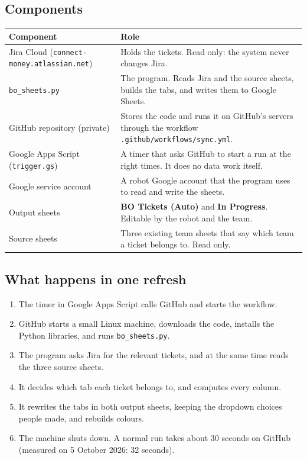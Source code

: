 \documentclass[11pt,a4paper]{article}
\newcommand{\code}[1]{\texttt{#1}}
\newcommand{\tab}[1]{\textbf{#1}}
\let\oldsubsection\subsection
\renewcommand{\subsection}{\needspace{7\baselineskip}\oldsubsection}
\begin{document}
\subsection{Components}
\begin{tabularx}{\linewidth}{@{}l L@{}}
\toprule
\textbf{Component} & \textbf{Role} \\
\midrule
Jira Cloud (\code{connect-money.atlassian.net}) & Holds the tickets. Read only: the system never changes Jira. \\
\code{bo\_sheets.py} & The program. Reads Jira and the source sheets, builds the tabs, and writes them to Google
Sheets. \\
GitHub repository (private) & Stores the code and runs it on GitHub's servers through the workflow
\code{.github/workflows/sync.yml}. \\
Google Apps Script (\code{trigger.gs}) & A timer that asks GitHub to start a run at the right times. It does no data
work itself. \\
Google service account & A robot Google account that the program uses to read and write the sheets. \\
Output sheets & \tab{BO Tickets (Auto)} and \tab{In Progress}. Editable by the robot and the team. \\
Source sheets & Three existing team sheets that say which team a ticket belongs to. Read only. \\
\bottomrule
\end{tabularx}

\subsection{What happens in one refresh}
\begin{enumerate}
  \item The timer in Google Apps Script calls GitHub and starts the workflow.
  \item GitHub starts a small Linux machine, downloads the code, installs the Python libraries, and runs
    \code{bo\_sheets.py}.
  \item The program asks Jira for the relevant tickets, and at the same time reads the three source sheets.
  \item It decides which tab each ticket belongs to, and computes every column.
  \item It rewrites the tabs in both output sheets, keeping the dropdown choices people made, and rebuilds colours.
  \item The machine shuts down. A normal run takes about 30 seconds on GitHub (measured on 5 October 2026: 32 seconds).
\end{enumerate}
\end{document}
